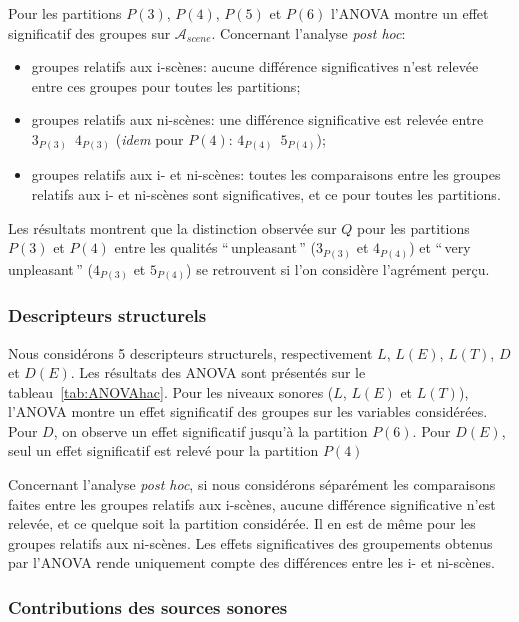 Pour les partitions $P(3)$, $P(4)$, $P(5)$ et $P(6)$ l'ANOVA montre un effet significatif des groupes sur $\mathcal{A}_{scene}$. Concernant l'analyse \emph{post hoc}:

\begin{itemize}
\item groupes relatifs aux i-scènes: aucune différence significatives n'est relevée entre ces groupes pour toutes les partitions;
\item groupes relatifs aux ni-scènes: une différence significative est relevée entre $3_{P(3)}$~\vs $4_{P(3)}$ (\emph{idem} pour $P(4)$: $4_{P(4)}$~\vs $5_{P(4)}$); 
\item groupes relatifs aux i- et ni-scènes: toutes les comparaisons entre les groupes relatifs aux i- et ni-scènes sont significatives, et ce pour toutes les partitions. 
\end{itemize}

Les résultats montrent que la distinction observée sur $Q$ pour les partitions $P(3)$ et $P(4)$ entre les qualités ``\,unpleasant\,'' ($3_{P(3)}$ et $4_{P(4)}$) et ``\,very unpleasant\,'' ($4_{P(3)}$ et $5_{P(4)}$) se retrouvent si l'on considère l'agrément perçu.

\subsubsection{Descripteurs structurels}

Nous considérons 5 descripteurs structurels, respectivement $L$, $L(E)$, $L(T)$, $D$ et $D(E)$. Les résultats des ANOVA sont présentés sur le tableau~\ref{tab:ANOVAhac}. Pour les niveaux sonores ($L$, $L(E)$ et $L(T)$), l'ANOVA montre un effet significatif des groupes sur les variables considérées. Pour $D$, on observe un effet significatif jusqu’à la partition $P(6)$. Pour $D(E)$, seul un effet significatif est relevé pour la partition $P(4)$

Concernant l'analyse \emph{post hoc}, si nous considérons séparément les comparaisons faites entre les groupes relatifs aux i-scènes, aucune différence significative n'est relevée, et ce quelque soit la partition considérée. Il en est de même pour les groupes relatifs aux ni-scènes. Les effets significatives des groupements obtenus par l'ANOVA rende uniquement compte des différences entre les i- et ni-scènes.

\subsubsection{Contributions des sources sonores}

